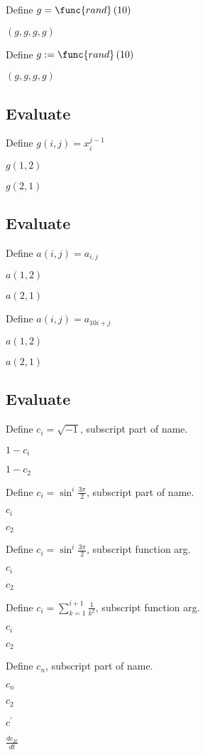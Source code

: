\documentclass{article}
\begin{document}
Define $g=\func{rand}\left( 10\right) $

$\left( g,g,g,g\right) $

Define $g:=\func{rand}\left( 10\right) $

$\left( g,g,g,g\right) $

\subsection{Evaluate}

Define $g\left( i,j\right) =x_{i}^{j-1}$

$g(1,2)$

$g\left( 2,1\right) $

\subsection{Evaluate}

Define $a\left( i,j\right) =a_{i,j}$

$a(1,2)$

$a\left( 2,1\right) $

Define $a\left( i,j\right) =a_{10i+j}$

$a(1,2)$

$a\left( 2,1\right) $

\subsection{Evaluate}

Define $c_{i}=\sqrt{-1}$, subscript part of name.

$1-c_{i}$

$1-c_{2}$

Define $c_{i}=\sin ^{i}\frac{3\pi }{2}$, subscript part of name.

$c_{i}$

$c_{2}$

Define $c_{i}=\sin ^{i}\frac{3\pi }{2}$, subscript function arg.

$c_{i}$

$c_{2}$

Define $c_{i}=\sum_{k=1}^{i+1}\frac{1}{k^{2}}$, subscript function arg.

$c_{i}$

$c_{2}$

Define $c_{n}$, subscript part of name.

$c_{n}$

$c_{2}$

$c^{\prime }$

$\frac{dc_{2t}}{dt}$
\end{document}
